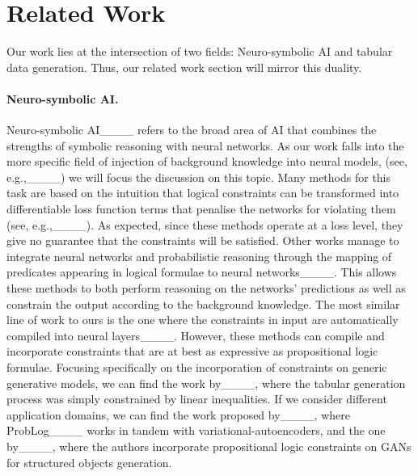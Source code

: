 \section{Related Work}
Our work lies at the intersection of two fields: Neuro-symbolic AI and tabular data generation. Thus, our related work section will mirror this duality.

\paragraph{Neuro-symbolic AI.} Neuro-symbolic AI____ refers to the broad area of AI
that combines the strengths of symbolic reasoning with neural networks. %
As our work falls into the more specific field of injection of background knowledge into neural models, (see, e.g.,____) we will focus the discussion on this topic.
Many methods for this task are based on the intuition that logical constraints can be transformed into differentiable loss function terms that penalise the networks for violating them (see, e.g.,____). As expected, since these methods operate at a loss level, they give no guarantee that the constraints will be satisfied. Other works manage to integrate neural networks and probabilistic reasoning through the mapping of predicates appearing in logical formulae to neural networks____. This allows these methods to both perform reasoning on the networks' predictions as well as constrain the output according to the background knowledge. The most similar line of work to ours is the one where the constraints in input are automatically compiled into neural layers____. However, these methods can compile and incorporate constraints that are at best as expressive as propositional logic formulae. %
Focusing specifically on the incorporation of constraints on generic generative models, we can find the work by____, where the tabular generation process was simply constrained by linear inequalities. If we consider different application domains, we can find the work proposed by____, where ProbLog____ works in tandem with variational-autoencoders, and the one by____, where the authors incorporate propositional logic constraints on GANs for structured objects generation. %

